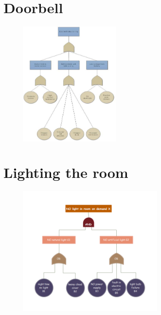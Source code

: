 \documentclass[aspectratio=1610,pdftex,dvipsnames,compress,xcolor={dvipsnames}]{beamer}
\begin{document}
\section{Doorbell}


\addtocounter{framenumber}{-1}
\begin{frame}{}
    \begin{figure}
        \centering
        \includegraphics[width=0.45\textwidth]{fault.tree_doorbell.jpg}
    \end{figure}
\end{frame}


\section{Lighting the room}


\addtocounter{framenumber}{-1}
\begin{frame}{}
    \begin{figure}
        \centering
        \includegraphics[width=0.65\textwidth]{fault.tree_room.jpg}
    \end{figure}
\end{frame}
\end{document}
